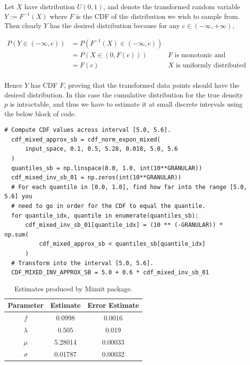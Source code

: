 \documentclass[12pt]{article}
\begin{document}
Let $X$ have distribution $U(0,1)$, and denote the transformed random variable $Y:=F^{-1}(X)$ where $F$ is the CDF of the distribution we wish to sample from.
Then clearly $Y$ has the desired distribution because for any $c\in(-\infty,+\infty)$,

\begin{align*}
    P(Y\in(-\infty, c)) & = P(F^{-1}(X)\in(-\infty, c)) \\
                        & = P(X\in(0, F(c))) & \text{$F$ is monotonic and increasing}\\
                        & = F(c) & \text{$X$ is uniformly distributed}\\
\end{align*}

Hence $Y$ has CDF $F$, proving that the transformed data points should have the desired distribution.
In this case the cumulative distribution for the true density $p$ is intractable, and thus we have to estimate it at small discrete intervals using the below block of code.

\begin{lstlisting}[caption=Code block producing array of values for inverse CDF of $p$ (e).]
  # Compute CDF values across interval [5.0, 5.6].
  cdf_mixed_approx_sb = cdf_norm_expon_mixed(
      input_space, 0.1, 0.5, 5.28, 0.018, 5.0, 5.6
  )
  quantiles_sb = np.linspace(0.0, 1.0, int(10**GRANULAR))
  cdf_mixed_inv_sb_01 = np.zeros(int(10**GRANULAR))
  # For each quantile in [0.0, 1.0], find how far into the range [5.0, 5.6] you
  # need to go in order for the CDF to equal the quantile.
  for quantile_idx, quantile in enumerate(quantiles_sb):
      cdf_mixed_inv_sb_01[quantile_idx] = (10 ** (-GRANULAR)) * np.sum(
          cdf_mixed_approx_sb < quantiles_sb[quantile_idx]
      )
  # Transform into the interval [5.0, 5.6].
  CDF_MIXED_INV_APPROX_SB = 5.0 + 0.6 * cdf_mixed_inv_sb_01
  \end{lstlisting}

\begin{table}[htp]
  \centering
  \begin{tabular}{| c | c | c |}
      \hline
      Parameter & Estimate & Error Estimate \\
      \hline
      $f$  & 0.0998 & 0.0016 \\
      \hline
      $\lambda$ & 0.505 & 0.019 \\
      \hline
      $\mu$ & 5.28014 & 0.00033 \\
      \hline
      $\sigma$ & 0.01787 & 0.00032 \\
      \hline
  \end{tabular}
  \caption{Estimates produced by Minuit package.}
  \label{tab1}
  \end{table}
\end{document}
